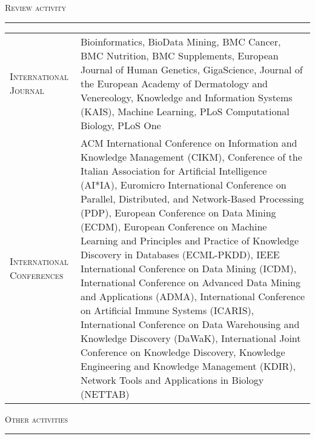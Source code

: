\documentclass[a4paper,10pt]{article}
\newcommand{\mediumtitle}[1]{
	\vspace{0.2cm}
	{\noindent
	\Large \textsc{#1}\\[-2ex]
	\hrule
	\vspace{0.2cm}}
}
\newenvironment{doubletablelist}
{
	\vspace{-0.2cm}
	\begin{longtable}[!h]{AB}}{\end{longtable}
}
\newcommand{\dtlist}[2]{
\hspace{-3cm}
\noindent
	\begin{minipage}{0.24\textwidth}
	\begin{flushright}
	\textsc{#1}
	\end{flushright}
	\end{minipage}
	& #2\\[0.2cm]
}
\newcommand{\minusitem}{\item[-]}
\begin{document}
\mediumtitle{Review activity}
\begin{doubletablelist}
\dtlist{International Journal}{
		Bioinformatics, BioData Mining, BMC Cancer, BMC Nutrition, BMC Supplements, European Journal of Human Genetics, GigaScience, Journal of the European Academy of Dermatology and Venereology, Knowledge and Information Systems (KAIS), Machine Learning, PLoS Computational Biology, PLoS One
	}
\dtlist{International Conferences}{
	ACM International Conference on Information and Knowledge Management (CIKM), Conference of the Italian Association for Artificial Intelligence (AI*IA), Euromicro International Conference on Parallel, Distributed, and Network-Based Processing (PDP),  European Conference on Data Mining (ECDM),  European Conference on Machine Learning and Principles and Practice of Knowledge Discovery in Databases (ECML-PKDD),  IEEE International Conference on Data Mining (ICDM),  International Conference on Advanced Data Mining and Applications (ADMA),  International Conference on Artificial Immune Systems (ICARIS), International Conference on Data Warehousing and Knowledge Discovery (DaWaK),  International Joint Conference on Knowledge Discovery, Knowledge Engineering and Knowledge Management (KDIR),  Network Tools and Applications in Biology (NETTAB)
}
\end{doubletablelist}



\mediumtitle{Other activities}

\end{document}
